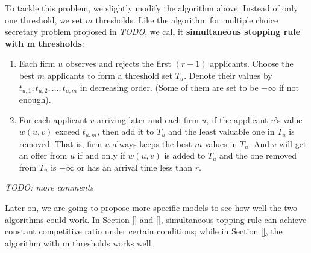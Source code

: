 To tackle this problem, we slightly modify the algorithm above.
Instead of only one threshold, we set $m$ thresholds.
Like the algorithm for multiple choice secretary problem proposed
in \emph{TODO}, we call it \textbf{simultaneous stopping rule with m
thresholds}:

\begin{enumerate}
    \item Each firm $u$ observes and rejects the first $(r - 1)$ applicants.
        Choose the best $m$ applicants to form a threshold set $T_u$.
        Denote their values by $t_{u,1}, t_{u,2}, \dots, t_{u,m}$
        in decreasing order.
        (Some of them are set to be $-\infty$ if not enough).

   \item For each applicant $v$ arriving later and each firm $u$, if the
       applicant $v$'s value $w(u,v)$ exceed $t_{u,m}$,
       then add it to $T_u$ and the least valuable one in $T_u$ is removed.
       That is, firm $u$ always keeps the best $m$ values in $T_u$.
       And $v$ will get an offer from $u$ if and only if $w(u,v)$ is added to $T_u$ and
       the one removed from $T_u$ is $-\infty$ or has an arrival time less than $r$.


\end{enumerate}



\emph{TODO: more comments}

Later on, we are going to propose more specific models to see how well the two algorithms could work.
In Section \ref{} and \ref{}, simultaneous topping rule can achieve constant competitive ratio under certain conditions;
while in Section \ref{}, the algorithm with m thresholds works well.


